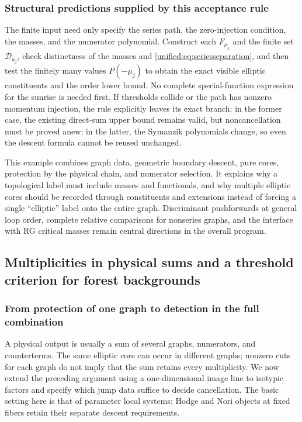 \documentclass[11pt,a4paper,oneside]{article}
\theoremstyle{plain}
\theoremstyle{definition}
\theoremstyle{remark}
\numberwithin{equation}{section}
\begin{document}
\subsubsection{Structural predictions supplied by this acceptance rule}
The finite input need only specify the series path, the zero-injection condition, the masses, and the numerator polynomial.
Construct each $F_{\mu_j}$ and the finite set $\mathcal D_{a_j}$,
check distinctness of the masses and \eqref{unified:eq:seriesseparation},
and then test the finitely many values $P(-\mu_j)$ to obtain the exact visible elliptic constituents and the order lower bound.
No complete special-function expression for the sunrise is needed first.
If thresholds collide or the path has nonzero momentum injection, the rule explicitly leaves its exact branch:
in the former case, the existing direct-sum upper bound remains valid, but noncancellation must be proved anew;
in the latter, the Symanzik polynomials change, so even the descent formula cannot be reused unchanged.

This example combines graph data, geometric boundary descent, pure cores, protection by the physical chain, and numerator selection.
It explains why a topological label must include masses and functionals, and why multiple elliptic cores should be recorded through constituents and extensions
instead of forcing a single ``elliptic'' label onto the entire graph.
Discriminant pushforwards at general loop order, complete relative comparisons for nonseries graphs, and the interface with RG critical masses
remain central directions in the overall program.




\subsection{Multiplicities in physical sums and a threshold criterion for forest backgrounds}\label{unified:sec:physicalsum}
\subsubsection{From protection of one graph to detection in the full combination}
A physical output is usually a sum of several graphs, numerators, and counterterms. The same elliptic core can occur in different graphs;
nonzero cuts for each graph do not imply that the sum retains every multiplicity. We now extend the preceding argument using a one-dimensional image line
to isotypic factors and specify which jump data suffice to decide cancellation.
The basic setting here is that of parameter local systems; Hodge and Nori objects at fixed fibers retain their separate descent requirements.
\end{document}
